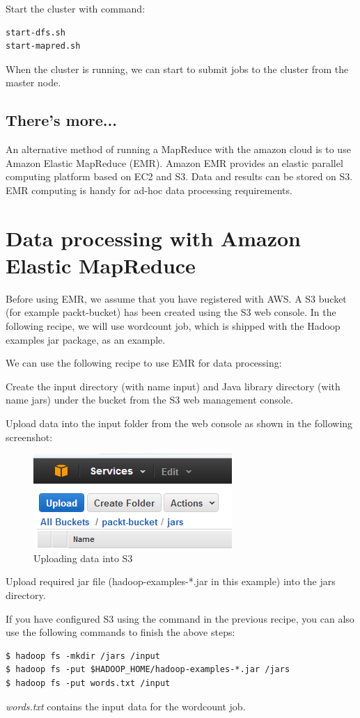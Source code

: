 Start the cluster with command:
\lstset{style=bashstyle}
\begin{lstlisting}
start-dfs.sh
start-mapred.sh
\end{lstlisting}

When the cluster is running, we can start to submit jobs to the cluster from the master node.
\subsection*{There's more...}
An alternative method of running a MapReduce with the amazon cloud is to use Amazon Elastic MapReduce (EMR). Amazon EMR provides an elastic parallel computing platform based on EC2 and S3. Data and results can be stored on S3. EMR computing is handy for ad-hoc data processing requirements.

\section{Data processing with Amazon Elastic MapReduce}
Before using EMR, we assume that you have registered with AWS. A S3 bucket (for example packt-bucket) has been created using the S3 web console. In the following recipe, we will use wordcount job, which is shipped with the Hadoop examples jar package, as an example.

We can use the following recipe to use EMR for data processing:

Create the input directory (with name input) and Java library directory (with name jars) under the bucket from the S3 web management console.

Upload data into the input folder from the web console as shown in the following screenshot:
\begin{figure}[ht]
  \centering
  \includegraphics[width=.5\textwidth]{figs/5163os_08_22.png}
  \caption{Uploading data into S3}\label{fig:aws.s3.upload}
\end{figure} 
Upload required jar file (hadoop-examples-*.jar in this example) into the jars directory.

If you have configured S3 using the command in the previous recipe, you can also use the following commands to finish the above steps:
\lstset{style=bashstyle}
\begin{lstlisting}
$ hadoop fs -mkdir /jars /input
$ hadoop fs -put $HADOOP_HOME/hadoop-examples-*.jar /jars
$ hadoop fs -put words.txt /input
\end{lstlisting}
\emph{words.txt} contains the input data for the wordcount job.

